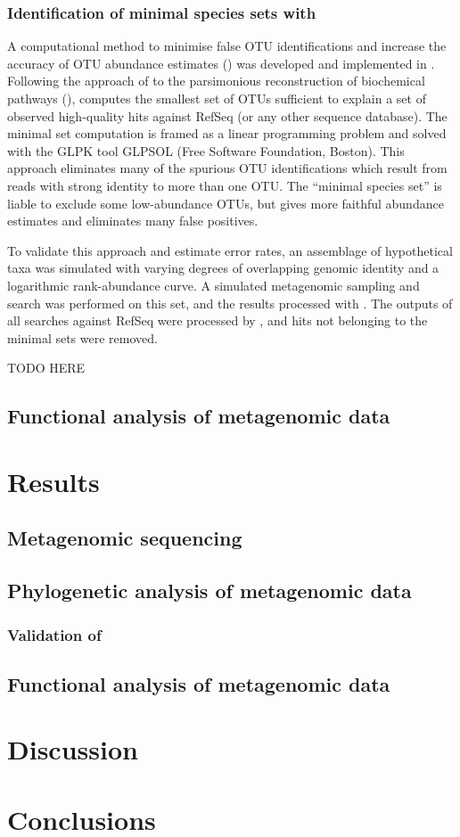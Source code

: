 \subsubsection{Identification of minimal species sets with }

A computational method to minimise false \ac{OTU} identifications and increase the accuracy of \ac{OTU} abundance estimates () was developed and implemented in .
Following the approach of \citet{Ye:2009bl} to the parsimonious reconstruction of biochemical pathways (),  computes the smallest set of OTUs sufficient to explain a set of observed high-quality hits against RefSeq (or any other sequence database).
The minimal set computation is framed as a linear programming problem and solved with the \ac{GLPK} tool \ac{GLPSOL} (Free Software Foundation, Boston).
This approach eliminates many of the spurious \ac{OTU} identifications which result from reads with strong identity to more than one \ac{OTU}. 
The ``minimal species set'' is liable to exclude some low-abundance \acp{OTU}, but gives more faithful abundance estimates and eliminates many false positives.

To validate this approach and estimate error rates, an assemblage of hypothetical taxa was simulated with varying degrees of overlapping genomic identity and a logarithmic rank-abundance curve. 
A simulated metagenomic sampling and  search was performed on this set, and the results processed with .
The outputs of all  searches against RefSeq were processed by , and hits not belonging to the minimal sets were removed.

TODO HERE 



\subsection{Functional analysis of metagenomic data}

\section{Results}
\subsection{Metagenomic sequencing}
\subsection{Phylogenetic analysis of metagenomic data}
\subsubsection{Validation of }
\subsection{Functional analysis of metagenomic data}

\section{Discussion}

\section{Conclusions}

